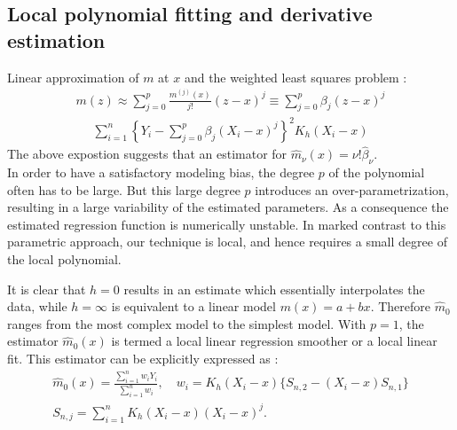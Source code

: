 \documentclass[12pt]{article}
\renewcommand{\=}[1]{\stackrel{#1}{=}} %
\theoremstyle{definition}
\begin{document}
\subsection{Local polynomial fitting and derivative estimation}
	Linear approximation of $m$ at $x$ and the weighted least squares problem :
	\begin{align}
	m(z)\approx\sum_{j=0}^p\frac{m^{(j)}(x)}{j!}(z-x)^j\equiv\sum_{j=0}^p\beta_j(z-x)^j
	\end{align}
	\begin{align}
	\sum_{i=1}^n\left\{Y_i-\sum_{j=0}^p\beta_j(X_i-x)^j\right\}^2K_h(X_i-x)
	\end{align}
	The above expostion suggests that an estimator for $\hat{m}_{\nu}(x)=\nu!\hat{\beta}_{\nu}$.\\
	In order to have a satisfactory modeling bias, the degree $p$ of the polynomial often has to be large. But this large degree $p$ introduces an over-parametrization, resulting in a large variability of the estimated parameters. As a consequence the estimated regression function is numerically unstable. In marked contrast to this parametric approach, our technique is local, and hence requires a small degree of the local polynomial.
	
	It is clear that $h=0$ results in an estimate which essentially interpolates the data, while $h=\infty$ is equivalent to a linear model $m(x)=a+bx$. Therefore $\hat{m}_0$ ranges from the most complex model to the simplest model.
	With $p=1$, the estimator $\hat{m}_0(x)$ is termed a local linear regression smoother or a local linear fit. This estimator can be explicitly expressed as :
	\begin{align}
	\hat{m}_0(x)=\frac{\sum_{i=1}^nw_iY_i}{\sum_{i=1}^nw_i},\quad w_i=K_h(X_i-x)\{S_{n,2}-(X_i-x)S_{n,1}\}\\
	S_{n,j}=\sum_{i=1}^nK_h(X_i-x)(X_i-x)^j.
	\end{align}
\end{document}
